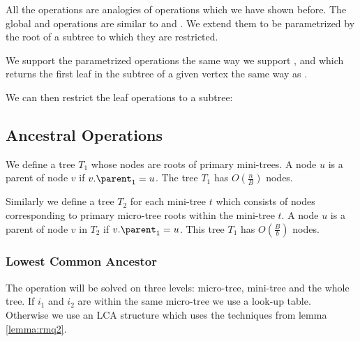 All the \leafAny{} operations are analogies of operations which we have shown before.
The global \leafRank{} and \leafSelect{} operations are similar to \preRank{} and \preSelect{}.
We extend them to be parametrized by the root of a subtree to which they are restricted.

We support the parametrized operations \leafSize{} the same way we support \subtreeSize{}, and \leafFirst{} which returns the first leaf in the subtree of a given vertex the same way as \deepestVertex{}.

We can then restrict the leaf operations to a subtree:
\begin{algorithm}
\begin{algorithmic}
	\State {}
\EndFunction
\end{algorithmic}
\end{algorithm}

\begin{algorithm}
\begin{algorithmic}
	\State {}
\EndFunction
\end{algorithmic}
\end{algorithm}

\subsection{Ancestral Operations}

We define a tree $T_1$ whose nodes are roots of primary mini-trees.
A node $u$ is a parent of node $v$ if $v.\parent_1 = u$.
The tree $T_1$ has $O\left(\frac{n}{B}\right)$ nodes.

Similarly we define a tree $T_2$ for each mini-tree $t$ which consists of nodes corresponding to primary micro-tree roots within the mini-tree $t$.
A node $u$ is a parent of node $v$ in $T_2$ if $v.\parent_1 = u$.
This tree $T_1$ has $O\left(\frac{B}{b}\right)$ nodes.

\subsubsection{Lowest Common Ancestor}

The operation \lca{} will be solved on three levels: micro-tree, mini-tree and the whole tree.
If $i_1$ and $i_2$ are within the same micro-tree we use a look-up table.
Otherwise we use an LCA structure which uses the techniques from lemma \ref{lemma:rmq2}.


